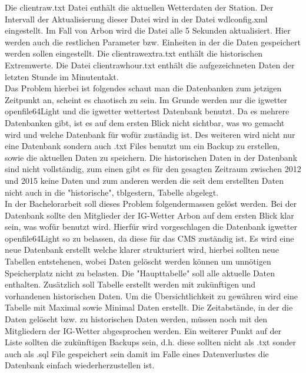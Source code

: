 \documentclass[a4paper,ngerman, 11pt, pagesize]{report}
\begin{document}
Die clientraw.txt Datei enthält die aktuellen Wetterdaten der Station. Der Intervall der Aktualisierung dieser Datei wird in der Datei wdlconfig.xml eingestellt. Im Fall von Arbon wird die Datei alle 5 Sekunden aktualisiert.  Hier werden auch die restlichen Parameter bzw. Einheiten in der die Daten gespeichert werden sollen eingestellt. Die clientrawextra.txt enthält die historischen Extremwerte. Die Datei clientrawhour.txt enthält die aufgezeichneten Daten der letzten Stunde im Minutentakt.\cite{WeatherDisplay} \\
Das Problem hierbei ist folgendes schaut man die Datenbanken zum jetzigen Zeitpunkt an, scheint es chaotisch zu sein. Im Grunde werden nur die igwetter openfile64Light und die igwetter wettertest Datenbank benutzt. Da es mehrere Datenbanken gibt,  ist es auf dem ersten Blick nicht sichtbar, was wo gemacht wird und welche Datenbank für wofür zuständig ist. Des weiteren wird nicht nur eine Datenbank sondern auch .txt Files benutzt um ein Backup zu erstellen, sowie die aktuellen Daten zu speichern. Die historischen Daten in der Datenbank sind nicht vollständig, zum einen gibt es für den gesagten Zeitraum zwischen 2012 und 2015 keine Daten und zum anderen werden die seit dem erstellten Daten nicht auch in die "historische", tblgestern, Tabelle abgelegt. \\
In der Bachelorarbeit soll dieses Problem folgendermassen gelöst werden. Bei der Datenbank sollte den Mitglieder der IG-Wetter Arbon auf dem ersten Blick klar sein, was wofür benutzt wird. Hierfür wird vorgeschlagen die Datenbank igwetter openfile64Light so zu belassen, da diese für das CMS zuständig ist. Es wird eine neue Datenbank erstellt welche klarer strukturiert wird, hierbei sollten neue Tabellen entstehenen, wobei Daten gelöscht werden können um unnötigen Speicherplatz nicht zu belasten. Die "Haupttabelle" soll alle aktuelle Daten enthalten. Zusätzlich soll Tabelle erstellt werden mit zukünftigen und vorhandenen historischen Daten. Um die Übersichtlichkeit zu gewähren wird eine Tabelle mit Maximal sowie Minimal Daten erstellt. Die Zeitabstände, in der die Daten gelöscht bzw. zu historischen Daten werden, müssen noch mit den Mitgliedern der IG-Wetter abgesprochen werden. Ein weiterer Punkt auf der Liste sollten die zukünftigen Backups sein, d.h. diese sollten nicht als .txt sonder auch als .sql File gespeichert sein damit im Falle eines Datenverlustes die Datenbank einfach wiederherzustellen ist.
\end{document}
